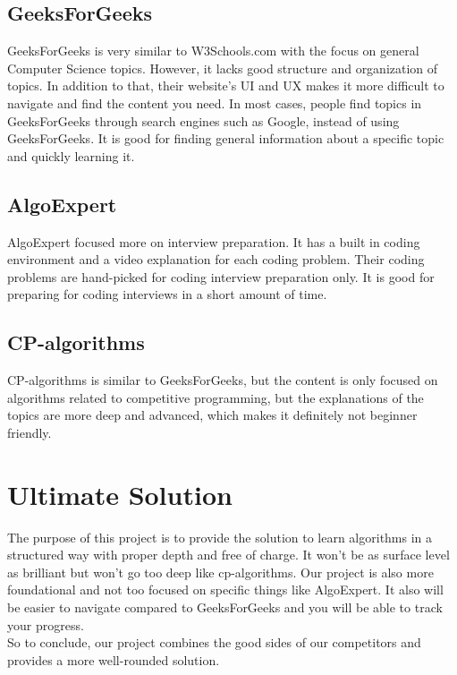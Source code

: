 \subsection{GeeksForGeeks}
GeeksForGeeks is very similar to W3Schools.com with the focus on general Computer Science topics. However, it lacks good structure and organization of topics. In addition to that, their website's UI and UX makes it more difficult to navigate and find the content you need. In most cases, people find topics in GeeksForGeeks through search engines such as Google, instead of using GeeksForGeeks. It is good for finding general information about a specific topic and quickly learning it. \\

\subsection{AlgoExpert }
AlgoExpert focused more on interview preparation. It has a built in coding environment and a video explanation for each coding problem. Their coding problems are hand-picked for coding interview preparation only. It is good for preparing for coding interviews in a short amount of time. \\

\subsection{CP-algorithms}
CP-algorithms is similar to GeeksForGeeks, but the content is only focused on algorithms related to competitive programming, but the explanations of the topics are more deep and advanced, which makes it definitely not beginner friendly. \\

\section{Ultimate Solution}
The purpose of this project is to provide the solution to learn algorithms in a structured way with proper depth and free of charge. It won't be as surface level as brilliant but won't go too deep like cp-algorithms. Our project is also more foundational and not too focused on specific things like AlgoExpert. It also will be easier to navigate compared to GeeksForGeeks and you will be able to track your progress. \\

So to conclude, our project combines the good sides of our competitors and provides a more well-rounded solution.
